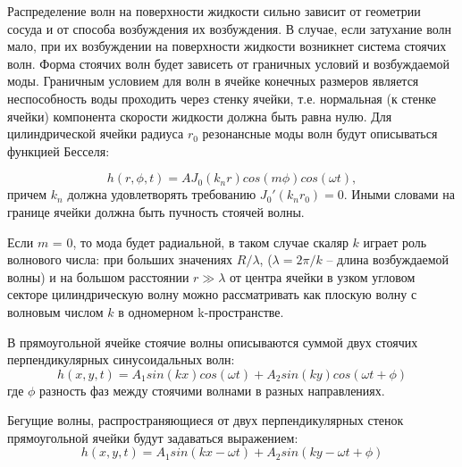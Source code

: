 Распределение волн на поверхности жидкости сильно зависит от геометрии сосуда и от способа возбуждения их возбуждения.
В случае, если затухание волн мало, при их возбуждении на поверхности жидкости возникнет система стоячих волн. Форма стоячих волн будет зависеть от граничных условий и возбуждаемой моды. Граничным условием для волн в ячейке конечных размеров является неспособность воды проходить через стенку ячейки, т.е. нормальная (к стенке ячейки) компонента скорости жидкости должна быть равна нулю. Для цилиндрической ячейки радиуса $r_0$ резонансные моды волн будут описываться функцией Бесселя:

\begin{equation}
 \label{eq:Bessel}
h(r, \phi, t) = A J_0(k_nr) cos(m\phi) cos(\omega t),
\end{equation}
причем $k_n$ должна удовлетворять требованию ${J_0}'(k_nr_0) = 0$. Иными словами на границе ячейки должна быть пучность стоячей волны.

Если $m$ = 0, то мода будет радиальной, в таком случае скаляр $k$ играет роль волнового числа: при больших значениях $R/\lambda$, ($\lambda = 2\pi/k$ – длина возбуждаемой волны) и на большом расстоянии $r \gg \lambda$ от центра ячейки в узком угловом секторе цилиндрическую волну можно рассматривать как плоскую волну с волновым числом $k$ в одномерном k-пространстве.

В прямоугольной ячейке стоячие волны описываются суммой двух стоячих перпендикулярных синусоидальных волн:
\begin{equation}
\label{eq:waveStand}
h(x, y, t) = A_1 sin(kx)cos(\omega t)+A_2 sin(ky)cos(\omega t+ \phi)
\end{equation}
где $\phi$ разность фаз между стоячими волнами в разных направлениях.

Бегущие волны, распространяющиеся от двух перпендикулярных стенок прямоугольной ячейки будут задаваться выражением:
\begin{equation}
\label{eq:waveRun}
h(x, y, t) = A_1 sin(kx-\omega t)+A_2 sin(ky-\omega t+ \phi)
\end{equation}



